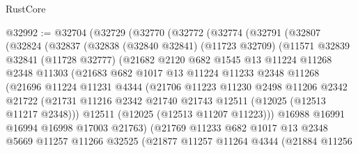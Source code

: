 \begin{lexlean}{RustCore}
\begin{coremodule}
@32992 := @32704
    (@32729
      (@32770
        (@32772
          (@32774
            (@32791
              (@32807
                (@32824
                  (@32837
                    (@32838
                      (@32840 @32841)
                      (@11723 @32709)
                      (@11571
                        @32839
                        @32841
                        (@11728 @32777)
                        (@21682
                          @2120
                          @682
                          @1545
                          @13
                          @11224
                          @11268
                          @2348
                          @11303
                          (@21683
                            @682
                            @1017
                            @13
                            @11224
                            @11233
                            @2348
                            @11268
                            (@21696
                              @11224
                              @11231
                              @4344
                              (@21706
                                @11223
                                @11230
                                @2498
                                @11206
                                @2342
                                @21722
                                (@21731
                                  @11216
                                  @2342
                                  @21740
                                  @21743
                                  @12511
                                  (@12025 (@12513 @11217 @2348)))
                                @12511
                                (@12025 (@12513 @11207 @11223)))
                              @16988
                              @16991
                              @16994
                              @16998
                              @17003
                              @21763)
                            (@21769
                              @11233
                              @682
                              @1017
                              @13
                              @2348
                              @5669
                              @11257
                              @11266
                              @32525
                              (@21877
                                @11257
                                @11264
                                @4344
                                (@21884
                                  @11256

\end{coremodule}
\end{lexlean}
